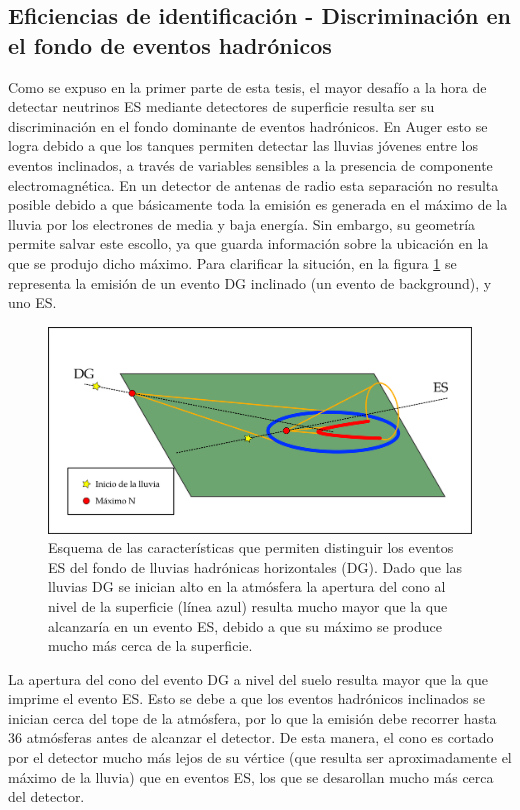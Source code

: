 	
	\subsection{Eficiencias de identificaci\'on - Discriminaci\'on en el fondo de eventos hadr\'onicos}
	\label{sc:identificacionRadio}

	Como se expuso en la primer parte de esta tesis, el mayor desaf\'io a la hora de detectar neutrinos ES mediante detectores de superficie resulta ser su discriminaci\'on en el fondo dominante de eventos hadr\'onicos.
	En Auger esto se logra debido a que los tanques \cher{} permiten detectar las lluvias j\'ovenes entre los eventos inclinados, a trav\'es de variables sensibles a la presencia de componente electromagn\'etica.
	En un detector de antenas de radio esta separaci\'on no resulta posible debido a que b\'asicamente toda la emisi\'on es generada en el m\'aximo de la lluvia por los electrones de media y baja energ\'ia.
	Sin embargo, su geometr\'ia permite salvar este escollo, ya que guarda informaci\'on sobre la ubicaci\'on en la que se produjo dicho m\'aximo.
	Para clarificar la situci\'on, en la figura \ref{fig:dg_vs_es_radio} se representa la emisi\'on \cher{} de un evento DG inclinado (un evento de background), y uno ES.
	\begin{figure}[ht!]
		\centering
		\includegraphics[width=\textwidth]{./fig/simulacionRadio/idRadio.png}
		\caption{\label{fig:dg_vs_es_radio}
		Esquema de las caracter\'isticas que permiten distinguir los eventos ES del fondo de lluvias hadr\'onicas horizontales (DG). Dado que las lluvias DG se inician alto en la atm\'osfera la apertura del cono \cher{} al nivel de la superficie (l\'inea azul) resulta mucho mayor que la que alcanzar\'ia en un evento ES, debido a que su m\'aximo se produce mucho m\'as cerca de la superficie.
		}
	\end{figure}
	La apertura del cono del evento DG a nivel del suelo resulta mayor que la que imprime el evento ES.
	Esto se debe a que los eventos hadr\'onicos inclinados se inician cerca del tope de la atm\'osfera, por lo que la emisi\'on debe recorrer hasta 36 atm\'osferas antes de alcanzar el detector.
	De esta manera, el cono \cher{} es cortado por el detector mucho m\'as lejos de su v\'ertice (que resulta ser aproximadamente el m\'aximo de la lluvia) que en eventos ES, los que se desarollan mucho m\'as cerca del detector.

